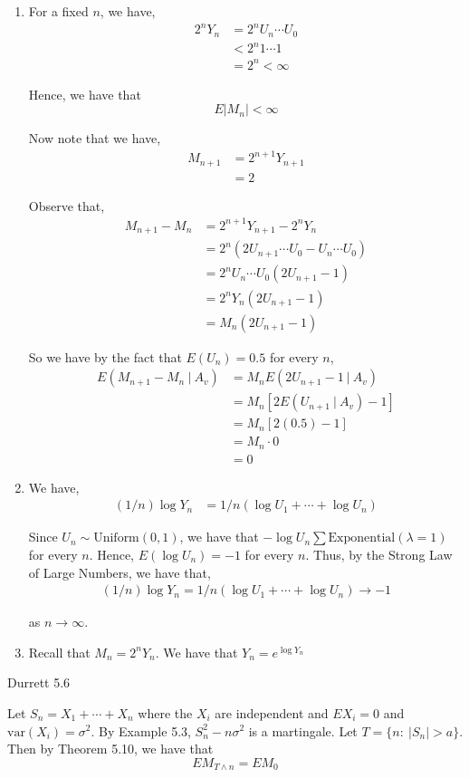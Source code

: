 \documentclass[12pt]{article}
\newenvironment{problem}[2][Problem]{\begin{trivlist}
\item[\hskip \labelsep {\bfseries #1}\hskip \labelsep {\bfseries #2.}]}{\end{trivlist}}
\begin{document}
\begin{enumerate}[label=(\alph*)]

\item For a fixed $n$, we have,
\begin{align*}
2^nY_n &= 2^nU_n \cdots U_0\\
&< 2^n 1 \cdots 1\\
&= 2^n < \infty
\end{align*} 

Hence, we have that $$E|M_n| < \infty$$

Now note that we have,
\begin{align*}
M_{n+1} &= 2^{n+1}Y_{n+1}\\
&= 2
\end{align*}

Observe that,
\begin{align*}
M_{n+1} - M_n &= 2^{n+1}Y_{n+1} - 2^nY_n\\
&= 2^n(2U_{n+1}\cdots U_0 - U_{n} \cdots U_0)\\
&= 2^nU_n \cdots U_0 (2U_{n+1} - 1)\\
&= 2^nY_n (2U_{n+1} - 1)\\
&= M_n (2U_{n+1} - 1)
\end{align*}

So we have by the fact that $E(U_n) = 0.5$ for every $n$,
\begin{align*}
E(M_{n+1} - M_n \ | \ A_v) &= M_n E(2U_{n+1} - 1 \ | \ A_v)\\
&= M_n \left[2E(U_{n+1} \ | \ A_v) - 1\right]\\
&= M_n \left[2(0.5) - 1 \right]\\
&= M_n \cdot 0\\
&= 0
\end{align*}

\item We have,
\begin{align*}
(1/n) \log Y_n &= 1/n (\log U_1 + \cdots + \log U_n)
\end{align*}

Since $U_n \sim \text{Uniform}(0,1)$, we have that $-\log U_n \sum \text{Exponential}(\lambda = 1)$ for every $n$. Hence, $E(\log U_n) = -1$ for every $n$. Thus, by the Strong Law of Large Numbers, we have that,
\begin{align*}
(1/n) \log Y_n = 1/n (\log U_1 + \cdots + \log U_n) \to -1
\end{align*}

as $n \to \infty$.

\item Recall that $M_n = 2^n Y_n$. We have that $Y_n = e^{\log Y_n}$

\end{enumerate}

\begin{problem}{III}
Durrett 5.6
\end{problem}

Let $S_n = X_1 + \cdots + X_n$ where the $X_i$ are independent and $EX_i = 0$ and $\text{var}(X_i) = \sigma^2$. By Example 5.3, $S_n^2 -n\sigma^2$ is a martingale. Let $T = \{n: \ |S_n| > a\}$. Then by Theorem 5.10, we have that $$EM_{T \wedge n} = EM_0$$
\end{document}
